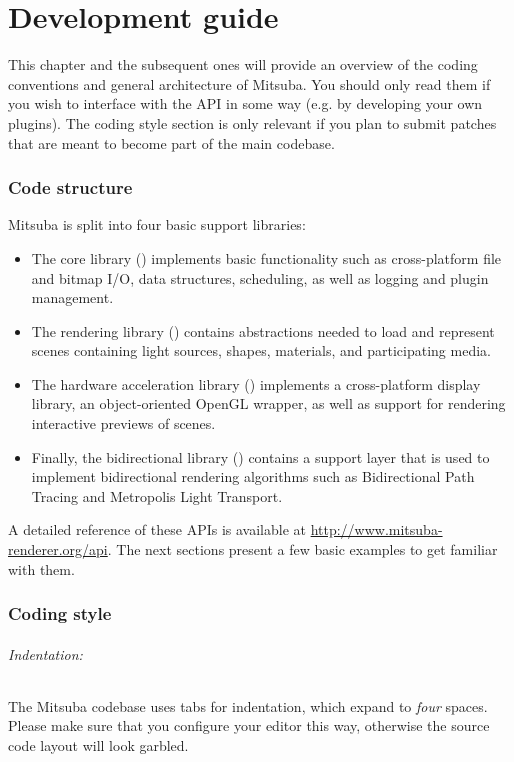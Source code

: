 \part{Development guide}
\label{sec:development}
This chapter and the subsequent ones will provide an overview
of the coding conventions and general architecture of Mitsuba.
You should only read them if you wish to interface with the API
in some way (e.g. by developing your own plugins). The coding style
section is only relevant if you plan to submit patches that are meant
to become part of the main codebase.

\section{Code structure}
Mitsuba is split into four basic support libraries:
\begin{itemize}
\item The core library () implements basic functionality such as
    cross-platform file and bitmap I/O, data structures, scheduling, as well as logging and plugin management.
\item The rendering library () contains abstractions
    needed to load and represent scenes containing  light sources, shapes, materials, and participating media.
\item The hardware acceleration library ()
    implements a cross-platform display library, an object-oriented OpenGL
    wrapper, as well as support for rendering interactive previews of scenes.
\item Finally, the bidirectional library ()
    contains a support layer that is used to implement bidirectional rendering algorithms such as
    Bidirectional Path Tracing and Metropolis Light Transport.
\end{itemize}
A detailed reference of these APIs is available at
\url{http://www.mitsuba-renderer.org/api}. The next sections
present a few basic examples to get familiar with them.

\section{Coding style}
\paragraph{Indentation:} The Mitsuba codebase uses tabs for indentation,
which expand to \emph{four} spaces. Please make sure that you configure your editor
this way, otherwise the source code layout will look garbled.

